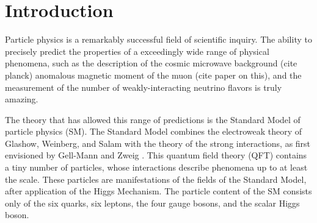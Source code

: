
\chapter{Introduction}


Particle physics is a remarkably successful field of scientific inquiry.
The ability to precisely predict the properties of a exceedingly wide range of physical phenomena, such as the description of the cosmic microwave background (cite planck)  anomalous magnetic moment of the muon (cite paper on this), and the measurement of the number of weakly-interacting neutrino flavors is truly amazing.

The theory that has allowed this range of predictions is the Standard Model of particle physics (SM).
The Standard Model combines the electroweak theory of Glashow, Weinberg, and Salam \cite{Glashow:1961tr, Weinberg:1967tq,  Salam:1968rm} with the theory of the strong interactions, as first envisioned by Gell-Mann and Zweig \cite{GellMann:1964nj, Zweig:1964jf}.
This quantum field theory (QFT) contains a tiny number of particles, whose interactions describe phenomena up to at least the \TeV\xspace scale.
These particles are manifestations of the fields of the Standard Model, after application of the Higgs Mechanism.
The particle content of the SM consists only of the six quarks, six leptons, the four gauge bosons, and the scalar Higgs boson.

